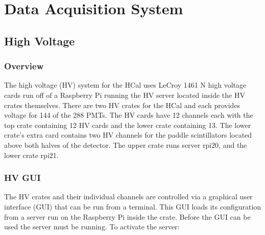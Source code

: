 \documentclass[oneside]{book}   %
\begin{document}
\chapter{Data Acquisition System}
\label{ch:daq}
\section{High Voltage}
\label{sec:hv}

\subsection{Overview}
\label{ssec:hv_overview}

The high voltage (HV) system for the HCal uses LeCroy 1461 N high voltage cards run off of a Raspberry Pi running the HV server located inside the HV crates themselves. There are two HV crates for the HCal and each provides voltage for 144 of the 288 PMTs. The HV cards have 12 channels each with the top crate containing 12 HV cards and the lower crate containing 13. The lower crate's extra card contains two HV channels for the paddle scintillators located above both halves of the detector. The upper crate runs server rpi20, and the lower crate rpi21. 

\subsection{HV GUI}
\label{ssec:gui}

The HV crates and their individual channels are controlled via a graphical user interface (GUI) that can be run from a terminal. This GUI loads its configuration from a server run on the Raspberry Pi inside the crate. Before the GUI can be used the server must be running. To activate the server:
\end{document}
